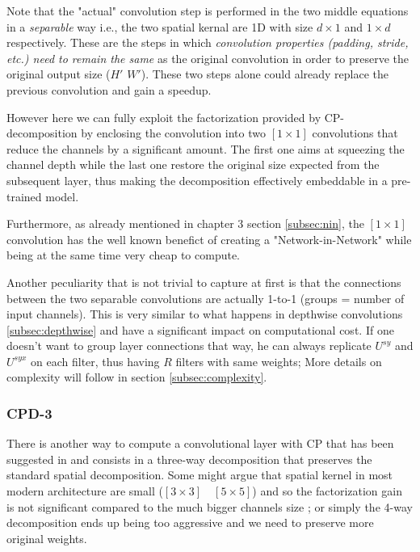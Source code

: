 Note that the "actual" convolution step is performed in the two middle equations in a \emph{separable} way i.e., the two spatial kernal are 1D with size $d \times 1$ and $1 \times d$ respectively. These are the steps in which \emph{convolution properties (padding, stride, etc.) need to remain the same} as the original convolution in order to preserve the original output size ($H'$ $W'$). These two steps alone could already replace the previous convolution and gain a speedup. 
\newline

However here we can fully exploit the factorization provided by CP-decomposition by enclosing the convolution into two $[1 \times 1]$ convolutions that reduce the channels by a significant amount. The first one aims at squeezing the channel depth while the last one restore the original size expected from the subsequent layer, thus making the decomposition effectively embeddable in a pre-trained model. 
\newline 

Furthermore, as already mentioned in chapter 	3 section \ref{subsec:nin}, the $[1 \times 1]$ convolution has the well known benefict of creating a  "Network-in-Network" while being at the same time very cheap to compute. 
\newline 

Another peculiarity that is not trivial to capture at first is that the connections between the two separable convolutions are actually 1-to-1 (groups = number of input channels). This is very similar to what happens in depthwise convolutions \ref{subsec:depthwise} and have a significant impact on computational cost. If one doesn't want to group layer connections that way, he can always replicate $U^{sy}$ and $U^{syx}$ on each filter, thus having $R$ filters with same weights; More details on complexity will follow in section \ref{subsec:complexity}.


\subsubsection{CPD-3}
There is another way to compute a convolutional layer with CP that has been suggested in\parencite{astrid2017} and consists in a three-way decomposition that preserves the standard spatial decomposition. Some might argue that spatial kernel in most modern architecture are small ($[3 \times 3] \quad [5 \times 5]$) and so the factorization gain is not significant compared to the much bigger channels size \parencite{Tucker-mobile}; or simply the 4-way decomposition ends up being too aggressive and we need to preserve more original weights.


